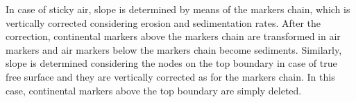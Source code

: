 \documentclass[hidelinks,10pt,a4paper]{article}
\begin{document}
In case of sticky air, slope is determined by means of the markers chain, which is vertically corrected considering erosion and sedimentation rates. After the
correction, continental markers above the markers chain are transformed in air markers and air markers below the markers chain become sediments. Similarly,
slope is determined considering the nodes on the top boundary in case of true free surface and they are vertically corrected as for the markers chain. In this
case, continental markers above the top boundary are simply deleted.

\end{document}
